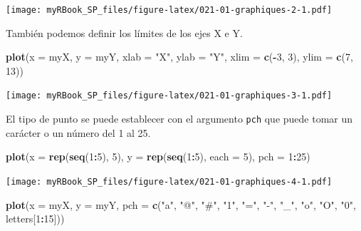 \documentclass[
]{book}
\newenvironment{Shaded}{\begin{snugshade}}{\end{snugshade}}
\newcommand{\DataTypeTok}[1]{\textcolor[rgb]{0.13,0.29,0.53}{#1}}
\newcommand{\DecValTok}[1]{\textcolor[rgb]{0.00,0.00,0.81}{#1}}
\newcommand{\KeywordTok}[1]{\textcolor[rgb]{0.13,0.29,0.53}{\textbf{#1}}}
\newcommand{\NormalTok}[1]{#1}
\newcommand{\OperatorTok}[1]{\textcolor[rgb]{0.81,0.36,0.00}{\textbf{#1}}}
\newcommand{\StringTok}[1]{\textcolor[rgb]{0.31,0.60,0.02}{#1}}
\begin{document}
\texttt{[image: myRBook\_SP\_files/figure-latex/021-01-graphiques-2-1.pdf]}

También podemos definir los límites de los ejes X e Y.

\begin{Shaded}
\begin{Highlighting}[]
\KeywordTok{plot}\NormalTok{(}\DataTypeTok{x =}\NormalTok{ myX, }\DataTypeTok{y =}\NormalTok{ myY, }
  \DataTypeTok{xlab =} \StringTok{"X"}\NormalTok{, }\DataTypeTok{ylab =} \StringTok{"Y"}\NormalTok{, }
  \DataTypeTok{xlim =} \KeywordTok{c}\NormalTok{(}\OperatorTok{-}\DecValTok{3}\NormalTok{, }\DecValTok{3}\NormalTok{), }\DataTypeTok{ylim =} \KeywordTok{c}\NormalTok{(}\DecValTok{7}\NormalTok{, }\DecValTok{13}\NormalTok{))}
\end{Highlighting}
\end{Shaded}

\texttt{[image: myRBook\_SP\_files/figure-latex/021-01-graphiques-3-1.pdf]}

El tipo de punto se puede establecer con el argumento \texttt{pch} que puede tomar un carácter o un número del 1 al 25.

\begin{Shaded}
\begin{Highlighting}[]
\KeywordTok{plot}\NormalTok{(}\DataTypeTok{x =} \KeywordTok{rep}\NormalTok{(}\KeywordTok{seq}\NormalTok{(}\DecValTok{1}\OperatorTok{:}\DecValTok{5}\NormalTok{), }\DecValTok{5}\NormalTok{), }\DataTypeTok{y =} \KeywordTok{rep}\NormalTok{(}\KeywordTok{seq}\NormalTok{(}\DecValTok{1}\OperatorTok{:}\DecValTok{5}\NormalTok{), }\DataTypeTok{each =} \DecValTok{5}\NormalTok{),}
  \DataTypeTok{pch =} \DecValTok{1}\OperatorTok{:}\DecValTok{25}\NormalTok{)}
\end{Highlighting}
\end{Shaded}

\texttt{[image: myRBook\_SP\_files/figure-latex/021-01-graphiques-4-1.pdf]}

\begin{Shaded}
\begin{Highlighting}[]
\KeywordTok{plot}\NormalTok{(}\DataTypeTok{x =}\NormalTok{ myX, }\DataTypeTok{y =}\NormalTok{ myY, }
  \DataTypeTok{pch =} \KeywordTok{c}\NormalTok{(}\StringTok{"a"}\NormalTok{, }\StringTok{"@"}\NormalTok{, }\StringTok{"#"}\NormalTok{, }\StringTok{"1"}\NormalTok{, }\StringTok{"="}\NormalTok{, }\StringTok{"-"}\NormalTok{, }\StringTok{"_"}\NormalTok{, }\StringTok{"o"}\NormalTok{, }\StringTok{"O"}\NormalTok{, }\StringTok{"0"}\NormalTok{, letters[}\DecValTok{1}\OperatorTok{:}\DecValTok{15}\NormalTok{]))}
\end{Highlighting}
\end{Shaded}
\end{document}
